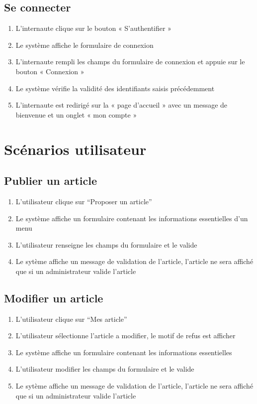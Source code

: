 \documentclass[a4paper,12pt, notitlepage]{report}
\begin{document}
\subsection{Se connecter}
\begin{enumerate}
    \item L'internaute clique sur le bouton « S’authentifier » 
    \item Le système affiche le formulaire de connexion 
    \item L'internaute rempli les champs du formulaire de connexion et appuie sur le bouton « Connexion » 
    \item Le système vérifie la validité des identifiants saisis précédemment 
    \item L'internaute est redirigé sur la « page d'accueil » avec un message de bienvenue et un onglet « mon compte » 
\end{enumerate}
\section{Scénarios utilisateur}
\subsection{Publier un article}
\begin{enumerate}
    \item L’utilisateur clique sur “Proposer un article” 
    \item Le système affiche un formulaire contenant les informations essentielles d’un menu
    \item L’utilisateur renseigne les champs du formulaire et le valide
    \item Le sytème affiche un message de validation de l’article, l’article ne sera affiché que si un administrateur valide l’article
\end{enumerate}
\subsection{Modifier un article}
\begin{enumerate}
    \item L’utilisateur clique sur “Mes article” 
    \item L’utilisateur sélectionne l’article a modifier, le motif de refus est afficher 
    \item Le système affiche un formulaire contenant les informations essentielles
    \item L’utilisateur modifier les champs du formulaire et le valide
    \item Le sytème affiche un message de validation de l’article, l’article ne sera affiché que si un administrateur valide l’article
\end{enumerate}
\end{document}
